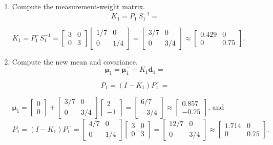 \documentclass[11pt]{article}
\begin{document}
\begin{enumerate}
  \item Compute the measurement-weight matrix.
  \[
  K_1 = P_1^-S_1^{-1} =
  \]

  \vspace{2.5em}

  \begin{solution}
  $K_1=P_1^-S_1^{-1}
   =\begin{bmatrix}3&0\\0&3\end{bmatrix}\begin{bmatrix}1/7&0\\0&1/4\end{bmatrix}
   =\begin{bmatrix}3/7&0\\0&3/4\end{bmatrix}
   \approx\begin{bmatrix}0.429&0\\0&0.75\end{bmatrix}$.
  \end{solution}

  \item Compute the new mean and covariance.
  \[
  \boldsymbol{\mu}_1 =
  \boldsymbol{\mu}_1^- + K_1\mathbf{d}_1 =
  \]

  \vspace{2.0em}

  \[
  P_1 = (I-K_1)P_1^- =
  \]

  \vspace{2.5em}

  \begin{solution}
  $\boldsymbol{\mu}_1
   =\begin{bmatrix}0\\0\end{bmatrix}
    +\begin{bmatrix}3/7&0\\0&3/4\end{bmatrix}\begin{bmatrix}2\\-1\end{bmatrix}
   =\begin{bmatrix}6/7\\-3/4\end{bmatrix}
   \approx\begin{bmatrix}0.857\\-0.75\end{bmatrix}$, and
  \[
  P_1=(I-K_1)P_1^-
    =\begin{bmatrix}4/7&0\\0&1/4\end{bmatrix}\begin{bmatrix}3&0\\0&3\end{bmatrix}
    =\begin{bmatrix}12/7&0\\0&3/4\end{bmatrix}
    \approx\begin{bmatrix}1.714&0\\0&0.75\end{bmatrix}.
  \]
  \end{solution}


\end{enumerate}
\end{document}
